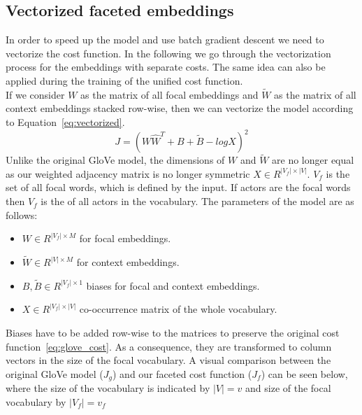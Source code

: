 \subsection{Vectorized faceted embeddings}
In order to speed up the model and use batch gradient descent we need to vectorize the cost function. In the following we go through the vectorization process for the embeddings with separate costs. The same idea can also be applied during the training of the unified cost function.\\
If we consider $W$ as the matrix of all focal embeddings and $\tilde{ W }$ as the matrix of all context embeddings stacked row-wise, then we can vectorize the model according to Equation~\ref{eq:vectorized}. 
\begin{equation}
J=(W \hat{  W }^{ T } +B+\tilde{ B } -log{ X })^{ 2 }
\label{eq:vectorized}
\end{equation}
Unlike the original GloVe model, the dimensions of  $W$ and $\tilde{ W } $ are no longer equal as our weighted adjacency matrix is no longer symmetric $X \in R^{|V_f|\times |V|} $.  $V_f$ is the set of all focal words, which is defined by the input. If actors are the focal words then $V_f$ is the  of all actors in the vocabulary. The parameters of the model are as follows: 
\begin{itemize}
\item $W \in R^{|V_f| \times M} $ for focal embeddings.
 \item $\tilde{ W }  \in R^{|V| \times M} $ for context embeddings.
\item $B,\tilde{B} \in R^{|V_f| \times 1}$ biases for focal and context embeddings.
\item $X \in R^{|V_f|\times |V|} $ co-occurrence matrix of the whole vocabulary. 
\end{itemize}
Biases have to be added row-wise to the matrices to preserve the original cost function~\ref{eq:glove_cost}. As a consequence, they are transformed to column vectors in the size of the focal vocabulary. A visual comparison between the original GloVe model ($J_g$) and our faceted cost function ($J_f$) can be seen below, where the size of the vocabulary is indicated by $|V|=v$ and size of the focal vocabulary by $|V_f|=v_f$\\
